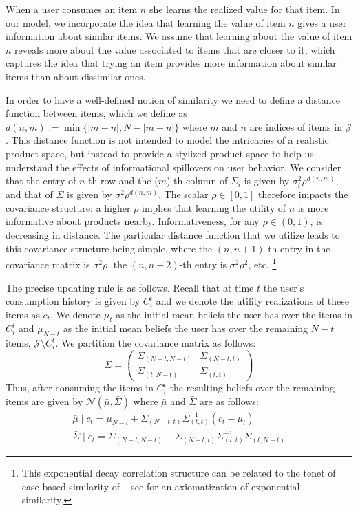 \documentclass[format=acmsmall, review=false]{acmart}
\newcommand{\xhdr}[1]{\vspace{1mm} \noindent{\bf #1}}
\begin{document}
\xhdr{User Learning}
When a user consumes an item $n$ she learns the realized value for that item. In our model, we incorporate the idea that learning the value of item $n$ gives a user information about similar items. 
We assume that learning about the value of item $n$ reveals more about the value associated to items that are closer to it, which captures the idea that trying an item provides more information about similar items than about dissimilar ones.
\par
In order to have a well-defined notion of similarity we need to define a distance function between items, which we define as $d(n,m):=\min\{ \lvert m - n \rvert ,N - \lvert m - n \rvert \}$ where $m$ and $n$ are indices of items in $\mathcal{J}$. This distance function is not intended to model the intricacies of a realistic product space, but instead to provide a stylized product space to help us understand the effects of informational spillovers on user behavior. We consider that the entry of $n$-th row and the ($m$)-th column of $\Sigma_i$ is given by $\sigma_i^2 \rho^{d(n,m)}$, and that of $\Sigma$ is given by $\sigma^2 \rho^{d(n,m)}$. The scalar $\rho \in [0,1]$ therefore impacts the covariance structure: a higher $\rho$ implies that learning the utility of $n$ is more informative about products nearby. Informativeness, for any $\rho \in (0,1)$, is decreasing in distance. The particular distance function that we utilize leads to this covariance structure being simple, where the $(n,n+1)$-th entry in the covariance matrix is $\sigma^{2} \rho$, the $(n,n+2)$-th entry is $\sigma^{2} \rho^2$, etc. \footnote{This exponential decay correlation structure can be related to the tenet of case-based similarity of \cite{gilboa1995case} -- see \cite{billot2008axiomatization} for an axiomatization of exponential similarity.}
\par
The precise updating rule is as follows. Recall that at time $t$ the user's consumption history is given by $C_{i}^{t}$ and we denote the utility realizations of these items as $c_t$. We denote $\mu_t$ as the initial mean beliefs the user has over the items in $C_{i}^{t}$ and $\mu_{N-t}$ as the initial mean beliefs the user has over the remaining $N-t$ items, $\mathcal{J} \setminus C_{i}^{t}$. We partition the covariance matrix as follows:
\[ \Sigma =  \left( \begin{array}{cc}
\Sigma_{(N-t, N-t)} & \Sigma_{(N-t,t)} \\
\Sigma_{(t,N-t)} & \Sigma_{(t,t)}
\end{array} \right)
\]
Thus, after consuming the items in $C_{i}^{t}$ the resulting beliefs over the remaining items are given by $\mathcal{N}(\bar{\mu}, \bar{\Sigma})$ where $\bar{\mu}$ and $\bar{\Sigma}$ are as follows:
\begin{align*}
\bar{\mu} \mid c_t = \mu_{N-t} + \Sigma_{(N-t,t)} \Sigma_{(t,t)}^{-1}(c_t - \mu_t) \\
\bar{\Sigma} \mid c_t = \Sigma_{(N-t,N-t)} - \Sigma_{(N-t,t)} \Sigma_{(t,t)}^{-1} \Sigma_{(t,N-t)}
\end{align*}
\end{document}
